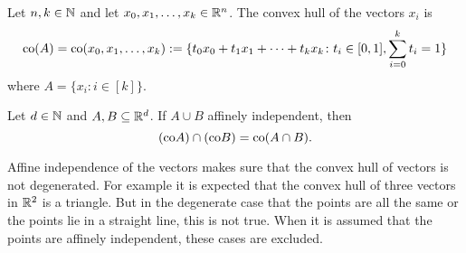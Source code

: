\begin{defin}
    Let $n,k \in \mathbb{N}$ and let $x_0, x_1, \ldots, x_k \in \mathbb{R}^n$. The convex hull of the vectors $x_i$ is
    \begin{equation*}
        {\rm co} (A) = {\rm co}(x_0, x_1, \ldots, x_k) := \{ t_0 x_0 + t_1 x_1 + \cdots + t_k x_k \colon t_i \in [0, 1], \sum\limits_{i=0}^k t_i = 1\}
    \end{equation*}
    where $A = \{x_i\colon i \in [k]\}$.  
\end{defin}

\begin{rem}
  Let $d\in\mathbb{N}$ and $A,B \subseteq \mathbb{R}^d$. If $A \cup B$ affinely independent, then
  \begin{equation*}
    ({\rm co} A) \cap ({\rm co}B) = {\rm co}(A \cap B).
  \end{equation*}
\end{rem}

Affine independence of the vectors makes sure that the convex hull of vectors is not degenerated.
For example it is expected that the convex hull of three vectors in $\mathbb{R}^2$ is a triangle. But in the degenerate case that the points are all the same
or the points lie in a straight line, this is not true. When it is assumed that the points are affinely independent, these cases are excluded. 

